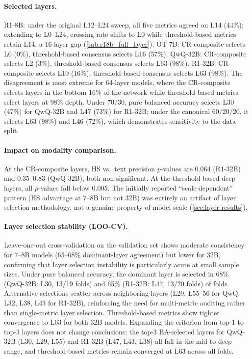 \paragraph{Selected layers.} R1-8B: under the original L12--L24 sweep, all five metrics agreed on L14 (44\%); extending to L0--L24, crossing rate shifts to L0 while threshold-based metrics retain L14, a 16-layer gap (\cref{tab:r18b_full_layer}). OT-7B: CR-composite selects L0 (0\%), threshold-based consensus selects L16 (57\%). QwQ-32B: CR-composite selects L2 (3\%), threshold-based consensus selects L63 (98\%). R1-32B: CR-composite selects L10 (16\%), threshold-based consensus selects L63 (98\%). The disagreement is most extreme for 64-layer models, where the CR-composite selects layers in the bottom 16\% of the network while threshold-based metrics select layers at 98\% depth. Under 70/30, pure balanced accuracy selects L30 (47\%) for QwQ-32B and L47 (73\%) for R1-32B; under the canonical 60/20/20, it selects L63 (98\%) and L46 (72\%), which demonstrates sensitivity to the data split.

\paragraph{Impact on modality comparison.} At the CR-composite layers, HS vs.\ text precision $p$-values are 0.064 (R1-32B) and 0.35--0.83 (QwQ-32B), both non-significant. At the threshold-based deep layers, all $p$-values fall below 0.005. The initially reported ``scale-dependent'' pattern (HS advantage at 7--8B but not 32B) was entirely an artifact of layer selection methodology, not a genuine property of model scale (\cref{sec:layer-results}).

\paragraph{Layer selection stability (LOO-CV).} Leave-one-out cross-validation on the validation set shows moderate consistency for 7--8B models (65--68\% dominant-layer agreement) but lower for 32B, confirming that layer selection instability is particularly acute at small sample sizes. Under pure balanced accuracy, the dominant layer is selected in 68\% (QwQ-32B: L30, 13/19 folds) and 65\% (R1-32B: L47, 13/20 folds) of folds. Alternative selections scatter across neighboring layers (L29, L55--56 for QwQ; L32, L38, L43 for R1-32B), reinforcing the need for multi-metric auditing rather than single-metric layer selection. Threshold-based metrics show tighter convergence to L63 for both 32B models. Expanding the criterion from top-1 to top-3 layers does not change conclusions: the top-3 BA-selected layers for QwQ-32B (L30, L29, L55) and R1-32B (L47, L43, L38) all fall in the mid-to-deep range, and threshold-based metrics remain converged at L63 across all folds.

